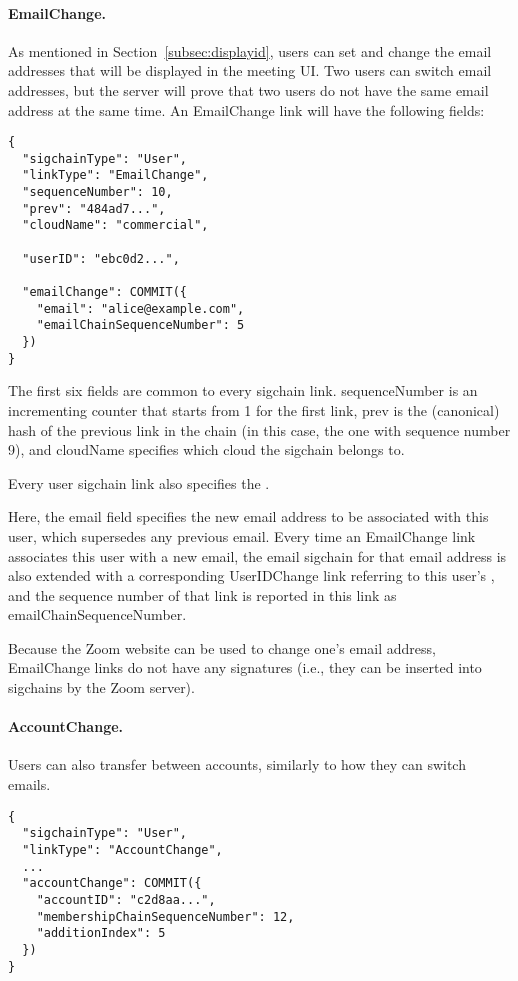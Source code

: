 \paragraph{EmailChange.} As mentioned in Section~\ref{subsec:displayid}, users can set and change the
email addresses that will be displayed in the meeting UI\@. Two users can switch email addresses,
but the server will prove that two users do not have the same email address at the same time. An
\textsf{EmailChange} link will have the following fields:


\begin{Verbatim}
{
  "sigchainType": "User",
  "linkType": "EmailChange",
  "sequenceNumber": 10,
  "prev": "484ad7...",
  "cloudName": "commercial",

  "userID": "ebc0d2...",

  "emailChange": COMMIT({
    "email": "alice@example.com",
    "emailChainSequenceNumber": 5
  })
}
\end{Verbatim}

The first six fields are common to every sigchain link. \textsf{sequenceNumber} is an incrementing counter that starts from 1 for the first link, \textsf{prev} is the (canonical) hash of the previous link in the chain (in this case,
the one with sequence number 9), and \textsf{cloudName}
specifies which cloud the sigchain belongs to.

Every user sigchain link also specifies the \userID.

Here, the \textsf{email} field specifies the new email address to be associated with this user,
which supersedes any previous email. Every time an \textsf{EmailChange} link associates this user
with a new email, the email sigchain for that email address is also extended with a corresponding
\textsf{UserIDChange} link referring to this user’s \userID, and the sequence number of that link is
reported in this link as \textsf{emailChainSequenceNumber}.

Because the Zoom website can be used to change one's email address, \textsf{EmailChange} links do
not have any signatures (i.e., they can be inserted into sigchains by the Zoom server).

\paragraph{AccountChange.} Users can also transfer between accounts, similarly to how they can
switch emails.

\begin{Verbatim}
{
  "sigchainType": "User",
  "linkType": "AccountChange",
  ...
  "accountChange": COMMIT({
    "accountID": "c2d8aa...",
    "membershipChainSequenceNumber": 12,
    "additionIndex": 5
  })
}
\end{Verbatim}

